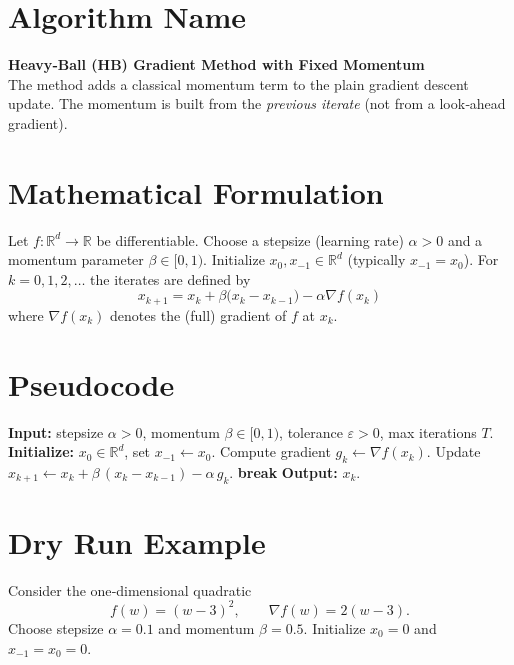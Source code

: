 \documentclass{article}
\newcommand{\R}{\mathbb{R}}
\newcommand{\norm}[1]{\left\lVert#1\right\rVert}
\begin{document}
\section*{Algorithm Name}
\textbf{Heavy‑Ball (HB) Gradient Method with Fixed Momentum}\\
The method adds a classical momentum term to the plain gradient descent update.  The momentum is built from the \emph{previous iterate} (not from a look‑ahead gradient).

\section*{Mathematical Formulation}
Let $f:\R^{d}\rightarrow\R$ be differentiable.  Choose a stepsize (learning rate) $\alpha>0$ and a momentum parameter $\beta\in[0,1)$.  
Initialize $x_{0},x_{-1}\in\R^{d}$ (typically $x_{-1}=x_{0}$).  For $k=0,1,2,\dots$ the iterates are defined by
\begin{equation}
\boxed{
x_{k+1}=x_{k}+\beta\bigl(x_{k}-x_{k-1}\bigr)-\alpha\nabla f(x_{k}) } \tag{HB}
\end{equation}
where $\nabla f(x_{k})$ denotes the (full) gradient of $f$ at $x_{k}$.

\section*{Pseudocode}
\begin{algorithm}[H]
\caption{Heavy‑Ball Gradient Method}
\begin{algorithmic}[1]
\STATE \textbf{Input:} stepsize $\alpha>0$, momentum $\beta\in[0,1)$, tolerance $\varepsilon>0$, max iterations $T$.
\STATE \textbf{Initialize:} $x_{0}\in\R^{d}$, set $x_{-1}\gets x_{0}$.
    \STATE Compute gradient $g_{k}\gets\nabla f(x_{k})$.
    \STATE Update $x_{k+1}\gets x_{k}+\beta\,(x_{k}-x_{k-1})-\alpha\,g_{k}$.
    \IF{$\norm{g_{k}}\le \varepsilon$}
        \STATE \textbf{break}
    \ENDIF
\ENDFOR
\STATE \textbf{Output:} $x_{k}$.
\end{algorithmic}
\end{algorithm}

\section*{Dry Run Example}
Consider the one‑dimensional quadratic
\[
f(w)=(w-3)^{2},\qquad \nabla f(w)=2(w-3).
\]
Choose stepsize $\alpha=0.1$ and momentum $\beta=0.5$.  
Initialize $x_{0}=0$ and $x_{-1}=x_{0}=0$.
\end{document}
